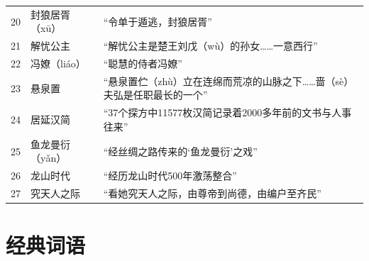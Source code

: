 \begin{table}[htbp]
\begin{tabularx}{\textwidth}{@{}c p{3cm} L@{}}
20 & 封狼居胥（xū） & “令单于遁逃，封狼居胥” \\
21 & 解忧公主 & “解忧公主是楚王刘戊（wù）的孙女……一意西行” \\
22 & 冯嫽（liáo） & “聪慧的侍者冯嫽” \\
23 & 悬泉置 & “悬泉置伫（zhù）立在连绵而荒凉的山脉之下……啬（sè）夫弘是任职最长的一个” \\
24 & 居延汉简 & “37个探方中11577枚汉简记录着2000多年前的文书与人事往来” \\
25 & 鱼龙曼衍（yǎn） & “经丝绸之路传来的‘鱼龙曼衍’之戏” \\
26 & 龙山时代 & “经历龙山时代500年激荡整合” \\
27 & 究天人之际 & “看她究天人之际，由尊帝到尚德，由编户至齐民” \\
\bottomrule
\end{tabularx}
\label{tab:heyizhongguo_fixed}
\end{table}


\section{经典词语}

